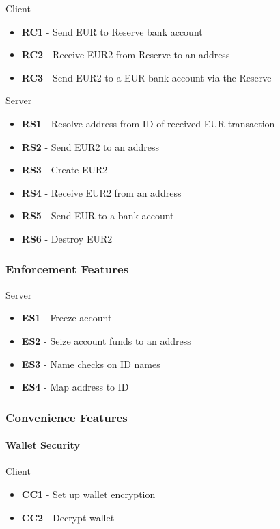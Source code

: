 \documentclass[12pt]{article} %
\begin{document}
{{Client
\begin{itemize}
	\item \textbf{RC1} - Send EUR to Reserve bank account
	\item \textbf{RC2} - Receive EUR2 from Reserve to an address
	\item \textbf{RC3} - Send EUR2 to a EUR bank account via the Reserve
\end{itemize}

Server
\begin{itemize}
	\item \textbf{RS1} - Resolve address from ID of received EUR transaction
	\item \textbf{RS2} - Send EUR2 to an address
	\item \textbf{RS3} - Create EUR2
	\item \textbf{RS4} - Receive EUR2 from an address
	\item \textbf{RS5} - Send EUR to a bank account
	\item \textbf{RS6} - Destroy EUR2
\end{itemize}

\subsubsection{Enforcement Features} \label{sssec:3.3:enforcement}

Server
\begin{itemize}
	\item \textbf{ES1} - Freeze account
	\item \textbf{ES2} - Seize account funds to an address
	\item \textbf{ES3} - Name checks on ID names
	\item \textbf{ES4} - Map address to ID
\end{itemize}

\subsubsection{Convenience Features} \label{sssec:3.3:backup}

\paragraph{Wallet Security}
Client
\begin{itemize}
	\item \textbf{CC1} - Set up wallet encryption
	\item \textbf{CC2} - Decrypt wallet
\end{itemize}

}}
\end{document}
